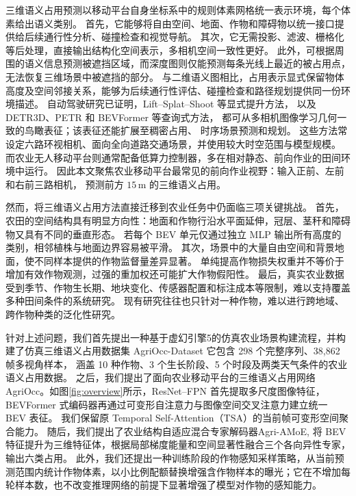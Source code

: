 \documentclass[a4paper,fleqn]{cas-sc}
\begin{document}
三维语义占用预测以移动平台自身坐标系中的规则体素网格统一表示环境，每个体素给出语义类别。
首先，它能够将自由空间、地面、作物和障碍物以统一接口提供给后续通行性分析、碰撞检查和视觉导航。
其次，它无需投影、滤波、栅格化等后处理，直接输出结构化空间表示，多相机空间一致性更好。
此外，可根据周围的语义信息预测被遮挡区域，而深度图则仅能预测每条光线上最近的被占用点，无法恢复三维场景中被遮挡的部分。
与二维语义图相比，占用表示显式保留物体高度及空间邻接关系，能够为后续通行性评估、碰撞检查和路径规划提供同一份环境描述。
自动驾驶研究已证明，Lift--Splat--Shoot 等显式提升方法\citep{philion2020lift,huang2021bevdet,li2022bevdepth}，
以及 DETR3D、PETR 和 BEVFormer 等查询式方法\citep{wang2022detr3d,li2022petr,li2022bevformer}，
都可从多相机图像学习几何一致的鸟瞰表征；该表征还能扩展至稠密占用\citep{wei2023surroundocc,wang2023openoccupancy}、
时序场景预测和规划\citep{zheng2024occworld,mei2025irwm}。
这些方法常设定六路环视相机、面向全向道路交通场景，并使用较大时空范围与模型规模。
而农业无人移动平台则通常配备低算力控制器，多在相对静态、前向作业的田间环境中运行。
因此本文聚焦农业移动平台最常见的前向作业视野：输入正前、左前和右前三路相机，
预测前方 $15\,$m 的三维语义占用。

然而，将三维语义占用方法直接迁移到农业任务中仍面临三项关键挑战。
首先，农田的空间结构具有明显方向性：地面和作物行沿水平面延伸，冠层、茎秆和障碍物又具有不同的垂直形态。
若每个 BEV 单元仅通过独立 MLP 输出所有高度的类别，相邻植株与地面边界容易被平滑。
其次，场景中的大量自由空间和背景地面，使不同样本提供的作物监督量差异显著。
单纯提高作物损失权重并不等价于增加有效作物观测，过强的重加权还可能扩大作物假阳性。
最后，真实农业数据受到季节、作物生长期、地块变化、传感器配置和标注成本等限制，难以支持覆盖多种田间条件的系统研究。
现有研究往往也只针对一种作物，难以进行跨地域、跨作物种类的泛化性研究。

针对上述问题，我们首先提出一种基于虚幻引擎5的仿真农业场景构建流程，并构建了仿真三维语义占用数据集 AgriOcc-Dataset
它包含 298 个完整序列、38,862 帧多视角样本，
涵盖 10 种作物、3 个生长阶段、5 个时段及两类天气条件的农业语义占用数据。
之后，我们提出了面向农业移动平台的三维语义占用网络 AgriOcc。如图\ref{fig:overview}所示，ResNet--FPN 首先提取多尺度图像特征，
BEVFormer 式编码器再通过可变形自注意力与图像空间交叉注意力建立统一 BEV 表征。
我们保留原 Temporal Self-Attention（TSA）的当前帧可变形空间聚合能力。
随后，我们提出了农业结构自适应混合专家解码器Agri-AMoE, 将 BEV特征提升为三维特征体，根据局部梯度能量和空间显著性融合三个各向异性专家，输出六类占用。
此外，我们还提出一种训练阶段的作物感知采样策略，从当前预测范围内统计作物体素，以小比例配额替换增强含作物样本的曝光；它在不增加每轮样本数，也不改变推理网络的前提下显著增强了模型对作物的感知能力。
\end{document}
